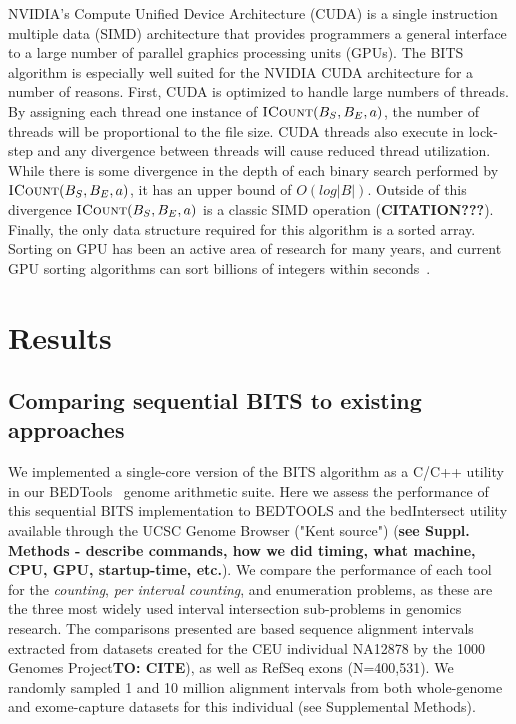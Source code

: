 \documentclass{bioinfo}
\begin{document}
        NVIDIA's Compute Unified Device Architecture (CUDA) is a single instruction
        multiple data (SIMD) architecture that provides programmers a general interface
        to a large number of parallel graphics processing units (GPUs).  The BITS
        algorithm is especially well suited for the NVIDIA CUDA architecture for a
        number of reasons.  First, CUDA is optimized to handle large numbers of
        threads.  By assigning each thread one instance of
        $\textsc{ICount}(B_S,B_E,a)$, the number of threads will be proportional to
        the file size.  CUDA threads also execute in lock-step and any divergence
        between threads will cause reduced thread utilization.  While there is some
        divergence in the depth of each binary search performed by
        $\textsc{ICount}(B_S,B_E,a)$, it has an upper bound of $O(log |B|)$.  Outside
        of this divergence $\textsc{ICount}(B_S,B_E,a)$ is a classic SIMD operation
        (\textbf{CITATION???}).
        Finally, the only data structure required for this algorithm is a sorted
        array.  Sorting on GPU has been an active area of research for many years, and
        current GPU sorting algorithms can sort billions of integers within
        seconds~\cite{merrill2011}.
        
        

        \section{Results}
        
        \subsection{Comparing sequential BITS to existing approaches}
        We implemented a single-core version of the BITS algorithm as a C/C++ utility 
        in our BEDTools~\citep{quinlan2010} genome arithmetic suite.
        Here we assess the performance of this sequential BITS implementation to BEDTOOLS and 
        the bedIntersect utility available through the UCSC Genome Browser ("Kent source") \citep{kent2002} 
        (\textbf{see Suppl. Methods - describe commands, how we did timing, what machine, CPU, GPU, startup-time, etc.}).
        We compare the performance of each tool for the \emph{counting}, \emph{per interval counting}, 
        and enumeration problems, as these are the three most widely used interval intersection sub-problems in genomics research. 
        The comparisons presented are based sequence alignment intervals extracted from datasets created 
        for the CEU individual NA12878 by the 1000 Genomes Project\textbf{TO: CITE}), as well as
        RefSeq exons (N=400,531).  We randomly sampled 1 and 10 million alignment intervals from both 
        whole-genome and exome-capture datasets for this individual (see Supplemental Methods).
        
\end{document}
